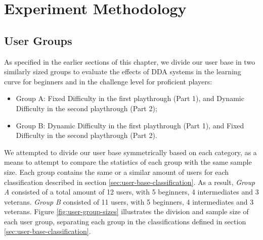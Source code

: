 \section{Experiment Methodology}
\label{sec:experiment-methodology}


\subsection{User Groups}


As specified in the earlier sections of this chapter, we divide our user base in two similarly sized groups to evaluate the effects of DDA systems in the learning curve for beginners and in the challenge level for proficient players:
\begin{itemize}
    \item{Group A: Fixed Difficulty in the first playthrough (Part 1), and Dynamic Difficulty in the second playthrough (Part 2);}
    \item{Group B: Dynamic Difficulty in the first playthrough (Part 1), and Fixed Difficulty in the second playthrough (Part 2).}
\end{itemize}


We attempted to divide our user base symmetrically based on each category, as a means to attempt to compare the statistics of each group with the same sample size. Each group contains the same or a similar amount of users for each classification described in section \ref{sec:user-base-classification}. As a result, \emph{Group A} consisted of a total amount of 12 users, with 5 beginners, 4 intermediates and 3 veterans. \emph{Group B} consisted of 11 users, with 5 beginners, 4 intermediates and 3 veterans. Figure \ref{fig:user-group-sizes} illustrates the division and sample size of each user group, separating each group in the classifications defined in section \ref{sec:user-base-classification}.

